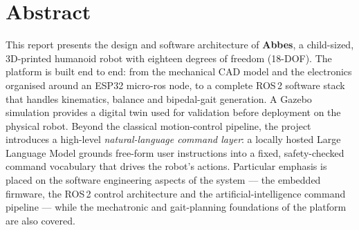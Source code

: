 \chapter*{Abstract}

This report presents the design and software architecture of
\textbf{Abbes}, a child-sized, 3D-printed humanoid robot with eighteen
degrees of freedom (18-DOF). The platform is built end to end: from the
mechanical CAD model and the electronics organised around an ESP32
micro-ros node, to a complete ROS\,2 software stack that handles
kinematics, balance and bipedal-gait generation. A Gazebo simulation
provides a digital twin used for validation before deployment on the
physical robot. Beyond the classical motion-control pipeline, the
project introduces a high-level \emph{natural-language command layer}:
a locally hosted Large Language Model grounds free-form user
instructions into a fixed, safety-checked command vocabulary that
drives the robot's actions. Particular emphasis is placed on the
software engineering aspects of the system --- the embedded firmware,
the ROS\,2 control architecture and the artificial-intelligence command
pipeline --- while the mechatronic and gait-planning foundations of the
platform are also covered.
